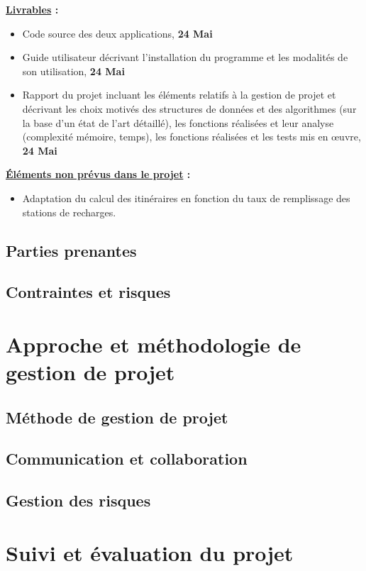 \documentclass[a4paper, 12pt]{report}
\begin{document}
\textbf{\underline{Livrables} :}
\begin{itemize}
  \item Code source des deux applications, \textbf{24 Mai}
  \item Guide utilisateur décrivant l'installation du programme et les modalités de son utilisation, \textbf{24 Mai}
  \item Rapport du projet incluant les éléments relatifs à la gestion de projet et décrivant les choix motivés des structures de données et des algorithmes (sur la base d'un état de l'art détaillé), les
fonctions réalisées et leur analyse (complexité mémoire, temps), les fonctions réalisées et les tests mis en œuvre, \textbf{24 Mai}
\end{itemize}
\bigskip

\textbf{\underline{Éléments non prévus dans le projet} :}
\begin{itemize}
  \item Adaptation du calcul des itinéraires en fonction du taux de remplissage des stations de recharges.
\end{itemize}

        \subsection{Parties prenantes}


        \subsection{Contraintes et risques}

\clearpage
    \section{Approche et méthodologie de gestion de projet}
        \subsection{Méthode de gestion de projet}
        \subsection{Communication et collaboration}
        \subsection{Gestion des risques}

\clearpage
    \section{Suivi et évaluation du projet}
\end{document}
